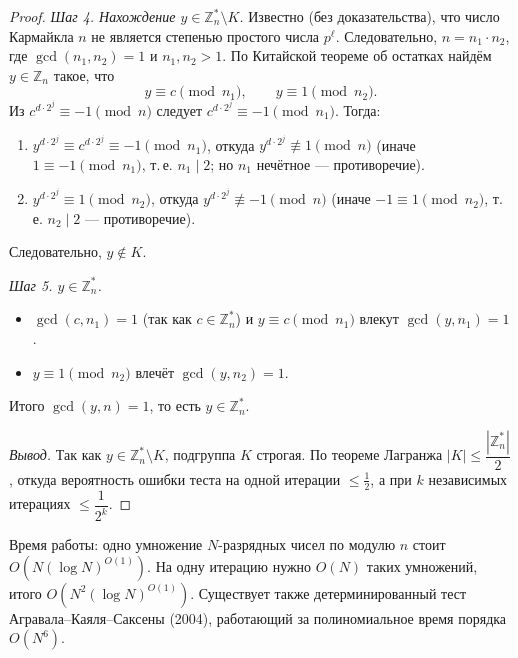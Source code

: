 \begin{proof}
	\smallskip
	\textit{Шаг 4. Нахождение $y \in \mathbb{Z}_n^* \setminus K$.}\; Известно (без доказательства), что число Кармайкла $n$ не является степенью простого числа $p^\ell$. Следовательно, $n = n_1 \cdot n_2$, где $\gcd(n_1,n_2)=1$ и $n_1,n_2 > 1$. По Китайской теореме об остатках найдём $y \in \mathbb{Z}_n$ такое, что
	\[
	y \equiv c \pmod{n_1}, \qquad y \equiv 1 \pmod{n_2}.
	\]
	Из $c^{d\cdot 2^j} \equiv -1 \pmod{n}$ следует $c^{d\cdot 2^j} \equiv -1 \pmod{n_1}$. Тогда:
	\begin{enumerate}
		\item $y^{d\cdot 2^j} \equiv c^{d\cdot 2^j} \equiv -1 \pmod{n_1}$, откуда $y^{d\cdot 2^j} \not\equiv 1 \pmod{n}$ (иначе $1 \equiv -1 \pmod{n_1}$, т.\,е. $n_1 \mid 2$; но $n_1$ нечётное --- противоречие).
		\item $y^{d\cdot 2^j} \equiv 1 \pmod{n_2}$, откуда $y^{d\cdot 2^j} \not\equiv -1 \pmod{n}$ (иначе $-1 \equiv 1 \pmod{n_2}$, т.\,е. $n_2 \mid 2$ --- противоречие).
	\end{enumerate}
	Следовательно, $y \notin K$.
	
	\smallskip
	\textit{Шаг 5. $y \in \mathbb{Z}_n^*$.}
	\begin{itemize}
		\item $\gcd(c,n_1)=1$ (так как $c \in \mathbb{Z}_n^*$) и $y \equiv c \pmod{n_1}$ влекут $\gcd(y,n_1)=1$.
		\item $y \equiv 1 \pmod{n_2}$ влечёт $\gcd(y,n_2)=1$.
	\end{itemize}
	Итого $\gcd(y,n)=1$, то есть $y \in \mathbb{Z}_n^*$.
	
	\smallskip
	\textit{Вывод.}\; Так как $y \in \mathbb{Z}_n^* \setminus K$, подгруппа $K$ строгая. По теореме Лагранжа $|K| \leq \dfrac{|\mathbb{Z}_n^*|}{2}$, откуда вероятность ошибки теста на одной итерации $\leq \tfrac{1}{2}$, а при $k$ независимых итерациях $\leq \dfrac{1}{2^k}$.
\end{proof}

\begin{Remark}{}{}
	Время работы: одно умножение $N$-разрядных чисел по модулю $n$ стоит $O\!\left(N (\log N)^{O(1)}\right)$. На одну итерацию нужно $O(N)$ таких умножений, итого $O\!\left(N^2 (\log N)^{O(1)}\right)$. Существует также детерминированный тест Агравала--Каяля--Саксены (2004), работающий за полиномиальное время порядка $O(N^6)$.
\end{Remark}